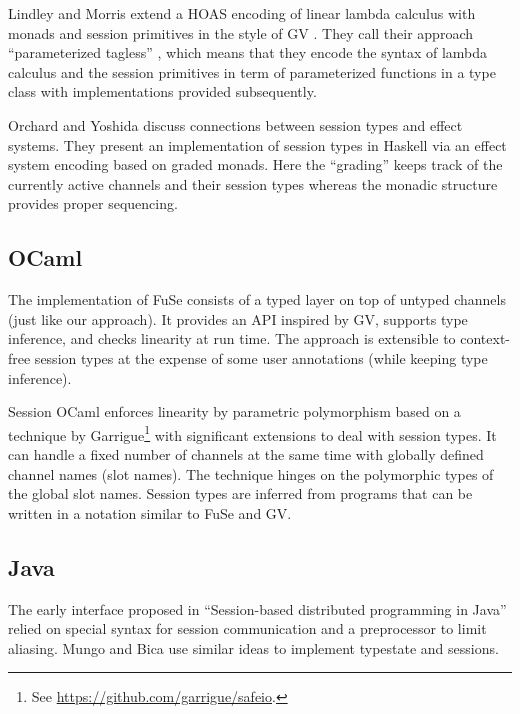 \documentclass[acmsmall,review,anonymous,screen]{acmart}
\begin{document}
Lindley and Morris \cite{DBLP:conf/haskell/LindleyM16} extend a HOAS
encoding of linear lambda calculus with monads and session primitives
in the style of GV \cite{DBLP:journals/jfp/GayV10}. They call their approach
``parameterized tagless'' \cite{DBLP:journals/jfp/CaretteKS09}, which means that they encode the syntax of
lambda calculus and the session primitives in term of parameterized
functions in a type class with implementations provided subsequently.

Orchard and Yoshida \cite{DBLP:conf/popl/OrchardY16} discuss
connections between session types and effect systems. They present an
implementation of session types in Haskell via an effect system
encoding based on graded monads. Here the ``grading'' keeps track of
the currently active channels and their session types whereas the
monadic structure provides proper sequencing.


\subsection{OCaml}
\label{sec:ocaml}

The implementation of FuSe \cite{DBLP:journals/jfp/Padovani17}
consists of a typed layer on top of untyped channels (just like our
approach).  It provides an API inspired by GV, supports
type inference, and checks linearity at run time. The approach is
extensible to context-free session types
\cite{DBLP:journals/toplas/Padovani19} at the expense of some user
annotations (while keeping type inference).

Session OCaml \cite{DBLP:journals/scp/ImaiYY19} enforces linearity by
parametric polymorphism based on a technique by
Garrigue\footnote{See \url{https://github.com/garrigue/safeio}.} with significant
extensions to deal with session types.
It can handle a fixed number of channels at the same time with
globally defined channel names (slot names). The technique hinges on
the polymorphic types of the global slot names.
Session types are inferred from programs that can be written in a notation
similar to FuSe and GV.


\subsection{Java}
\label{sec:java}

The early interface proposed in ``Session-based distributed programming in Java''
\cite{DBLP:conf/ecoop/HuYH08} relied on special syntax for session
communication and a preprocessor to limit aliasing.
Mungo \cite{DBLP:journals/scp/KouzapasDPG18} and Bica
\cite{DBLP:journals/corr/abs-1205-5344} use similar ideas to implement
typestate and sessions.
\end{document}
